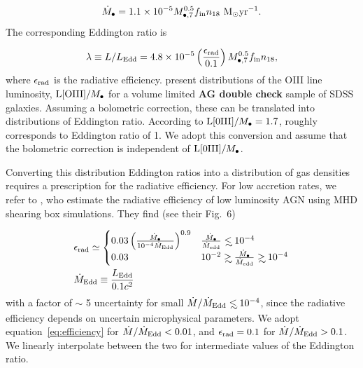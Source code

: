 \documentclass[usenatbib,fleqn]{mnras}
\newcommand\lsim{\mathrel{\rlap{\lower4pt\hbox{\hskip1pt$\sim$}}
    \raise1pt\hbox{$<$}}}
\newcommand\gsim{\mathrel{\rlap{\lower4pt\hbox{\hskip1pt$\sim$}}
    \raise1pt\hbox{$>$}}}
\newcommand{\Mbh}[1][]{M_{\bullet#1}}
\newcommand{\Msun}{{\rm M_\odot}}
\begin{document}
\begin{equation}
  \dot{M}_{\bullet} = 1.1\times 10^{-5} \Mbh[,7]^{0.5} f_{\rm in}
  n_{18} \,\,\Msun {\rm yr}^{-1}.
\end{equation}
%
The corresponding Eddington ratio is

\begin{equation}
  \lambda\equiv L/L_{\rm Edd} = 4.8 \times 10^{-5}
  \left(\frac{\epsilon_{\rm rad}}{0.1}\right) \Mbh[,7]^{0.5} f_{\rm in}
  n_{18},
\label{eq:n18Edd}
\end{equation}
%
where $\epsilon_{\rm rad}$ is the radiative
efficiency. \citet{Kauffmann&Heckman2009} present distributions of the
OIII line luminosity, ${\rm L[OIII]}/\Mbh$ for a volume limited {\bf
  AG double check} sample of SDSS galaxies.  Assuming a bolometric
correction, these can be translated into distributions of Eddington
ratio.  According to \citet{Kauffmann&Heckman2009} ${\rm
  L[0III]}/\Mbh=1.7$, roughly corresponds to Eddington ratio of 1. We
adopt this conversion and assume that the bolometric correction is
independent of ${\rm L[0III]}/\Mbh$.

Converting this distribution Eddington ratios into a distribution of
gas densities requires a prescription for the radiative efficiency.  For
low accretion rates, we refer to \citet{Sharma+2007}, who estimate the
radiative efficiency of low luminosity AGN using MHD shearing box
simulations.  They find (see their Fig.~6)

\begin{align}
&\epsilon_{\rm rad} \simeq 
\begin{cases}
  0.03 \left(\frac{\dot{M}_{\bullet}}{10^{-4}\dot{M}_{\rm Edd}}\right)^{0.9} & \frac{\dot{M}_{\bullet}}{\dot{M}_{\rm edd}} \lsim 10^{-4} \\
 0.03 &  10^{-2} \gsim \frac{\dot{M}_{\bullet}}{\dot{M}_{\rm edd}}
 \gsim  10^{-4}
\end{cases}\nonumber\\
&\dot{M}_{\rm Edd} \equiv \frac{L_{\rm Edd}}{0.1 c^2}
\label{eq:efficiency}
\end{align}
%
with a factor of $\sim$ 5 uncertainty for small $\dot{M}/\dot{M}_{\rm
  Edd}\lsim 10^{-4}$, since the radiative efficiency depends on
uncertain microphysical parameters. We adopt
equation~\eqref{eq:efficiency} for $\dot{M}/\dot{M}_{\rm Edd}<0.01$,
and $\epsilon_{\rm rad}=0.1$ for $\dot{M}/\dot{M}_{\rm Edd}>0.1$. We
linearly interpolate between the two for intermediate values of the
Eddington ratio.
\end{document}
